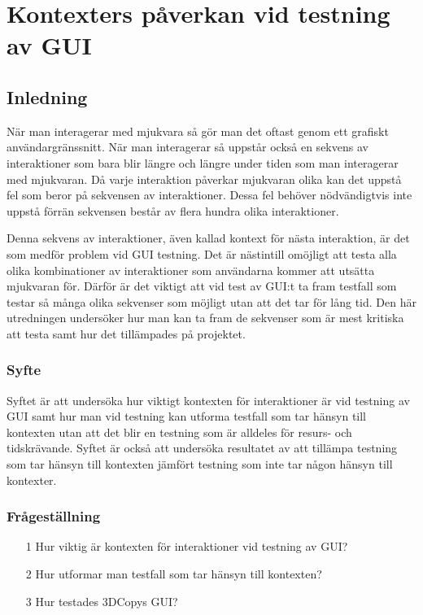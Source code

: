 \chapter{Kontexters påverkan vid testning av GUI}
\label{cha:indiv-report-holmberg}

\section{Inledning}
\label{sec:introduction-holmberg}

När man interagerar med mjukvara så gör man det oftast genom ett grafiskt användargränssnitt. När man interagerar så uppstår också en sekvens av interaktioner som bara blir längre och längre under tiden som man interagerar med mjukvaran. Då varje interaktion påverkar mjukvaran olika kan det uppstå fel som beror på sekvensen av interaktioner. Dessa fel behöver nödvändigtvis inte uppstå förrän sekvensen består av flera hundra olika interaktioner.

Denna sekvens av interaktioner, även kallad kontext för nästa interaktion, är det som medför problem vid GUI testning. Det är nästintill omöjligt att testa alla olika kombinationer av interaktioner som användarna kommer att utsätta mjukvaran för. Därför är det viktigt att vid test av GUI:t ta fram testfall som testar så många olika sekvenser som möjligt utan att det tar för lång tid. Den här utredningen undersöker hur man kan ta fram de sekvenser som är mest kritiska att testa samt hur det tillämpades på projektet.

\subsection{Syfte}
\label{sec:purpose-holmberg}

Syftet är att undersöka hur viktigt kontexten för interaktioner är vid testning av GUI samt hur man vid testning kan utforma testfall som tar hänsyn till kontexten utan att det blir en testning som är alldeles för resurs- och tidskrävande. Syftet är också att undersöka resultatet av att tillämpa testning som tar hänsyn till kontexten jämfört testning som inte tar någon hänsyn till kontexter.

\subsection{Frågeställning}
\label{sec:issue-holmberg}

\begin{itemize}
	\item [1] Hur viktig är kontexten för interaktioner vid testning av GUI?
	\item [2] Hur utformar man testfall som tar hänsyn till kontexten?
	\item [3] Hur testades 3DCopys GUI?
\end{itemize}

